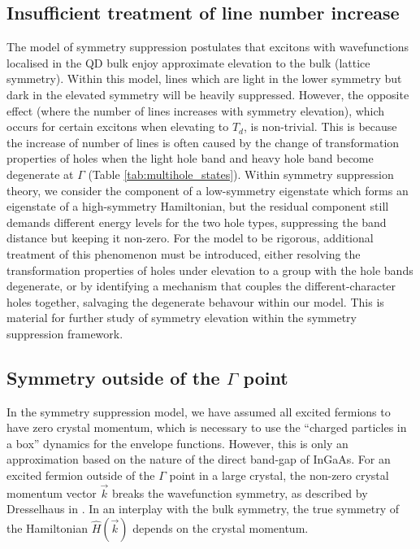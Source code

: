 \subsection{Insufficient treatment of line number increase} \label{sec:failed_degeneracy}
The model of symmetry suppression postulates that excitons with wavefunctions localised in the QD bulk enjoy approximate elevation to the bulk (lattice symmetry). Within this model, lines which are light in the lower symmetry but dark in the elevated symmetry will be heavily suppressed. However, the opposite effect (where the number of lines increases with symmetry elevation), which occurs for certain excitons when elevating to $T_d$, is non-trivial. This is because the increase of number of lines is often caused by the change of transformation properties of holes when the light hole band and heavy hole band become degenerate at $\Gamma$ (Table \ref{tab:multihole_states}). Within symmetry suppression theory, we consider the component of a low-symmetry eigenstate which forms an eigenstate of a high-symmetry Hamiltonian, but the residual component still demands different energy levels for the two hole types, suppressing the band distance but keeping it non-zero. For the model to be rigorous, additional treatment of this phenomenon must be introduced, either resolving the transformation properties of holes  under elevation to a group with the hole bands degenerate, or by identifying a mechanism that couples the different-character holes together, salvaging the degenerate behavour within our model. This is material for further study of symmetry elevation within the symmetry suppression framework.

\subsection{Symmetry outside of the $\Gamma$ point} \label{sec:symmetry_outside_gamma}
In the symmetry suppression model, we have assumed all excited fermions to have zero crystal momentum, which is necessary to use the ``charged particles in a box'' dynamics for the envelope functions. However, this is only an approximation based on the nature of the direct band-gap of InGaAs. For an excited fermion outside of the $\Gamma$ point in a large crystal, the non-zero crystal momentum vector $\vec{k}$ breaks the wavefunction symmetry, as described by Dresselhaus in \cite[Ch. 13]{dresselhaus}. In an interplay with the bulk symmetry, the true symmetry of the Hamiltonian $\hat{H}\left(\vec{k}\right)$ depends on the crystal momentum. 


